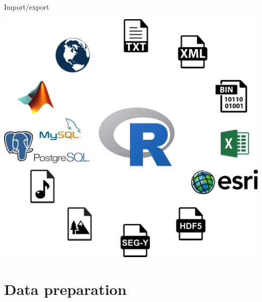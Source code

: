 \documentclass[9pt,ignorenonframetext,]{beamer}
\begin{document}
\begin{frame}{Import/export}

\includegraphics{imgPres/input.png}

\end{frame}

\section{Data preparation}\label{data-preparation}
\end{document}
